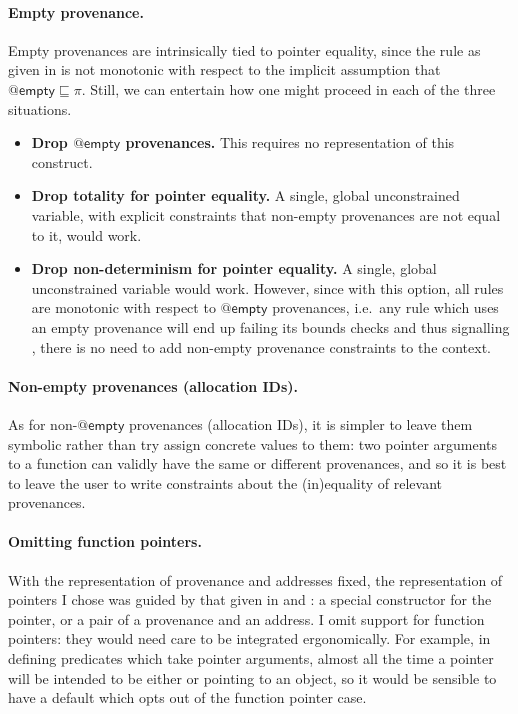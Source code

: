 \paragraph{Empty provenance.}%
Empty provenances are intrinsically tied to pointer equality, since the rule
as given in  is not monotonic with respect to the implicit assumption
that $@\mathsf{empty} \sqsubseteq \pi$. Still, we can entertain how one might
proceed in each of the three situations.
\begin{itemize}
    \item \textbf{Drop $@\mathsf{empty}$ provenances.} This requires
        no representation of this construct.
    \item \textbf{Drop totality for pointer equality.}
        A single, global unconstrained variable, with explicit constraints that
        non-empty provenances are not equal to it, would work.
    \item \textbf{Drop non-determinism for pointer equality.}
        A single, global unconstrained variable would work. However, since with
        this option, all rules are monotonic with respect to $@\mathsf{empty}$
        provenances, i.e.\ any rule which uses an empty provenance will end up
        failing its bounds checks and thus signalling , there is no need
        to add non-empty provenance constraints to the context.
\end{itemize}

\paragraph{Non-empty provenances (allocation IDs).}%
As for non-$@\mathsf{empty}$ provenances (allocation IDs), it is simpler to
leave them symbolic rather than try assign concrete values to them: two pointer
arguments to a function can validly have the same or different provenances, and
so it is best to leave the user to write constraints about the (in)equality of %
relevant provenances.

\paragraph{Omitting function pointers.}%
With the representation of provenance and addresses fixed, the representation
of pointers I chose was guided by that given in  and :
a special constructor for the  pointer, or a pair of a
provenance and an address. I omit support for function pointers:
they would need care to be integrated ergonomically. For example, in defining
predicates which take pointer arguments, almost all the time a pointer will be
intended to be either  or pointing to an object, so it would be sensible to
have a default which opts out of the function pointer case.

